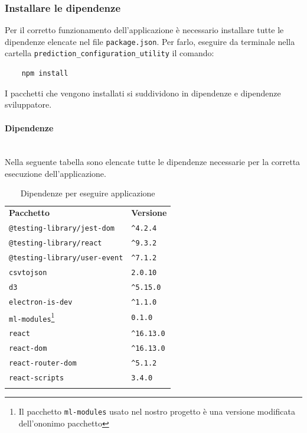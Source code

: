 \subsubsection{Installare le dipendenze}%
Per il corretto funzionamento dell'applicazione è necessario installare tutte le dipendenze elencate nel file \texttt{package.json}. Per farlo, eseguire da terminale nella cartella \verb|prediction_configuration_utility| il comando:
\begin{verbatim}
	npm install
\end{verbatim}
I pacchetti che vengono installati si suddividono in dipendenze e dipendenze sviluppatore.

\paragraph*{Dipendenze}\mbox{}\\ [1mm]
Nella seguente tabella sono elencate tutte le dipendenze necessarie per la corretta esecuzione dell'applicazione.
\mbox{}\\ [1mm]
	\setcounter{table}{0}
	\begin{longtable} {
		>{}p{65mm} 
		>{}p{30mm}
		}
    \rowcolor{gray!50}
    \textbf{Pacchetto} & \textbf{Versione} \TBstrut \\ [2mm]
    \verb|@testing-library/jest-dom| & \verb|^4.2.4|  \TBstrut \\ [2mm]
    \verb|@testing-library/react| & \verb|^9.3.2| \TBstrut \\ [2mm]
    \verb|@testing-library/user-event| & \verb|^7.1.2| \TBstrut \\ [2mm]
    \verb|csvtojson| & \verb|2.0.10| \TBstrut \\ [2mm]
    \verb|d3| & \verb|^5.15.0| \TBstrut \\ [2mm]
    \verb|electron-is-dev| & \verb|^1.1.0| \TBstrut \\ [2mm]
    \verb|ml-modules|\footnote{Il pacchetto \texttt{ml-modules} usato nel nostro progetto è una versione modificata dell'ononimo pacchetto} & \verb|0.1.0| \TBstrut \\ [2mm]
    \verb|react| & \verb|^16.13.0| \TBstrut \\ [2mm]
    \verb|react-dom| & \verb|^16.13.0| \TBstrut \\ [2mm]
    \verb|react-router-dom| & \verb|^5.1.2| \TBstrut \\ [2mm]
    \verb|react-scripts| & \verb|3.4.0| \TBstrut \\ [2mm]
    \rowcolor{white}
    \caption{Dipendenze per eseguire applicazione}
    \end{longtable}
    
